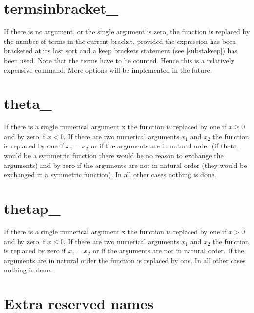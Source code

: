  
\section{termsinbracket\_}
\label{funtermsinbracket}
\noindent If there is no argument, or the single argument is zero, the 
function is replaced by the number of terms in the current 
bracket, provided the expression has been bracketed at its 
last sort and a keep brackets statement (see \ref{substakeep}) has been 
used. Note that the terms have to be counted. Hence this is a relatively 
expensive command. More options will be implemented in the future.


\section{theta\_}
\label{funtheta}
\noindent If there is a single numerical argument x the function is 
replaced by one if $x \ge 0$ and by zero if $x < 0$. If there are two 
numerical arguments $x_1$ and $x_2$ the function is replaced by one if $x_1 
= x_2$ or if the arguments are in natural order (if theta\_ would be a 
symmetric function there would be no reason to exchange the arguments) and 
by zero if the arguments are not in natural order (they would be exchanged 
in a symmetric function). In all other cases nothing is done.


\section{thetap\_}
\label{funthetap}
\noindent If there is a single numerical argument x the function is 
replaced by one if $x > 0$ and by zero if $x \le 0$. If there are two 
numerical arguments $x_1$ and $x_2$ the function is replaced by zero if $x_1 
= x_2$ or if the arguments are not in natural order. If the arguments are 
in natural order the function is replaced by one. In all other cases 
nothing is done.



\section{Extra reserved names}

